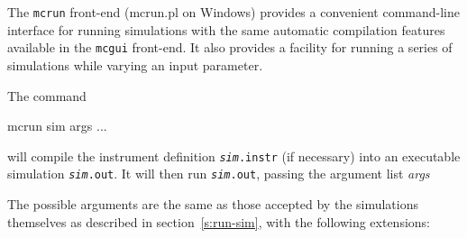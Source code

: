 The \verb+mcrun+ front-end (mcrun.pl on Windows) provides a convenient
command-line interface for running simulations with the same automatic
compilation features available in the \verb+mcgui+ front-end. It also provides a
facility for running a series of simulations while varying an input parameter.

The command

\begin{bash}
mcrun sim args ...
\end{bash}

will compile the instrument definition \texttt{\textit{sim}.instr} (if
necessary) into an executable simulation \texttt{\textit{sim}.out}. It
will then run \texttt{\textit{sim}.out}, passing the argument list \textit{
  args}

The possible arguments are the same as those accepted by the simulations
themselves as described in section~\ref{s:run-sim}, with the following
extensions:
